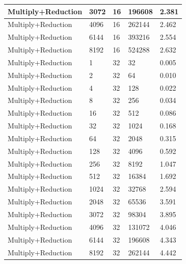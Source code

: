 \documentclass{article}
\begin{document}
\begin{longtable}{|l|l|l|l|l|}
Multiply+Reduction & 3072 & 16          & 196608            & 2.381             \\ \hline
Multiply+Reduction & 4096 & 16          & 262144            & 2.462             \\ \hline
Multiply+Reduction & 6144 & 16          & 393216            & 2.554             \\ \hline
Multiply+Reduction & 8192 & 16          & 524288            & 2.632             \\ \hline
Multiply+Reduction & 1    & 32          & 32                & 0.005             \\ \hline
Multiply+Reduction & 2    & 32          & 64                & 0.010             \\ \hline
Multiply+Reduction & 4    & 32          & 128               & 0.022             \\ \hline
Multiply+Reduction & 8    & 32          & 256               & 0.034             \\ \hline
Multiply+Reduction & 16   & 32          & 512               & 0.086             \\ \hline
Multiply+Reduction & 32   & 32          & 1024              & 0.168             \\ \hline
Multiply+Reduction & 64   & 32          & 2048              & 0.315             \\ \hline
Multiply+Reduction & 128  & 32          & 4096              & 0.592             \\ \hline
Multiply+Reduction & 256  & 32          & 8192              & 1.047             \\ \hline
Multiply+Reduction & 512  & 32          & 16384             & 1.692             \\ \hline
Multiply+Reduction & 1024 & 32          & 32768             & 2.594             \\ \hline
Multiply+Reduction & 2048 & 32          & 65536             & 3.591             \\ \hline
Multiply+Reduction & 3072 & 32          & 98304             & 3.895             \\ \hline
Multiply+Reduction & 4096 & 32          & 131072            & 4.046             \\ \hline
Multiply+Reduction & 6144 & 32          & 196608            & 4.343             \\ \hline
Multiply+Reduction & 8192 & 32          & 262144            & 4.442             \\ \hline

\end{longtable}
\end{document}
